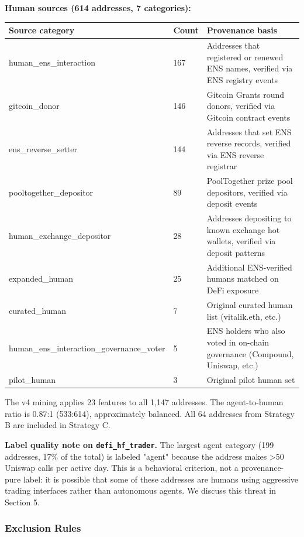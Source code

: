 \documentclass[sigconf,nonacm=false]{acmart}
\begin{document}
\textbf{Human sources (614 addresses, 7 categories):}

\begin{table}[h]
\centering
\small
\begin{tabular}{lll}
\toprule
Source category & Count & Provenance basis \\
\midrule
human\_ens\_interaction & 167 & Addresses that registered or renewed ENS names, verified via ENS registry events \\
gitcoin\_donor & 146 & Gitcoin Grants round donors, verified via Gitcoin contract events \\
ens\_reverse\_setter & 144 & Addresses that set ENS reverse records, verified via ENS reverse registrar \\
pooltogether\_depositor & 89 & PoolTogether prize pool depositors, verified via deposit events \\
human\_exchange\_depositor & 28 & Addresses depositing to known exchange hot wallets, verified via deposit patterns \\
expanded\_human & 25 & Additional ENS-verified humans matched on DeFi exposure \\
curated\_human & 7 & Original curated human list (vitalik.eth, etc.) \\
human\_ens\_interaction\_governance\_voter & 5 & ENS holders who also voted in on-chain governance (Compound, Uniswap, etc.) \\
pilot\_human & 3 & Original pilot human set \\
\bottomrule
\end{tabular}
\end{table}

The v4 mining applies 23 features to all 1,147 addresses. The agent-to-human ratio is 0.87:1 (533:614), approximately balanced. All 64 addresses from Strategy B are included in Strategy C.

\textbf{Label quality note on \texttt{defi\_hf\_trader}.} The largest agent category (199 addresses, 17\% of the total) is labeled "agent" because the address makes >50 Uniswap calls per active day. This is a behavioral criterion, not a provenance-pure label: it is possible that some of these addresses are humans using aggressive trading interfaces rather than autonomous agents. We discuss this threat in Section 5.

\subsubsection{Exclusion Rules}
\end{document}
